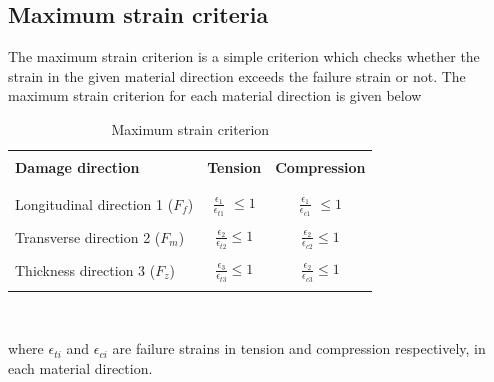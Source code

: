 \documentclass[12pt,twoside]{report}
\begin{document}
\subsection{Maximum strain criteria}\label{Maximum strain criteria}
\indent\indent\indent The maximum strain criterion is a simple criterion which checks whether the strain in the given material direction exceeds the failure strain or not. The maximum strain criterion for each material direction is given below\\
\begin{table}[htbp]
  \begin{center}
     \begin{tabular}{l  c  c} 
     \hline
     \\
      \textbf{Damage direction} \;\;& \textbf{Tension} \;& \textbf{Compression}\\
      \\
      \hline
      \\
      Longitudinal direction 1 ($F_{f}$) & \Large{$\frac{\epsilon_{1}}{\epsilon_{t1}} $}\small{ $\leq 1$} &  \Large{$\frac{\epsilon_{1}}{\epsilon_{c1}} $}\small{ $\leq 1$}\\
      \\
      Transverse direction 2 ($F_{m}$)  &  \Large{$\frac{\epsilon_{2}}{\epsilon_{t2}} $}\small{$\leq 1$}  & \Large{$\frac{\epsilon_{2}}{\epsilon_{c2}} $}\small{$\leq 1$}\\
      \\
      Thickness direction 3 ($F_{z}$) &  \Large{$\frac{\epsilon_{3}}{\epsilon_{t3}} $}\small{$\leq 1$}  &   \Large{$\frac{\epsilon_{2}}{\epsilon_{c3}} $}\small{$\leq 1$}\\
       \\
       \hline
    \end{tabular}
    \\
    \caption{Maximum strain criterion}
    \label{tab:Maximum strain criterion}
  \end{center}
\end{table}
\FloatBarrier
where $\epsilon_{ti}$ and $\epsilon_{ci}$ are failure strains in tension and compression respectively, in each material direction. 
\\
\end{document}
